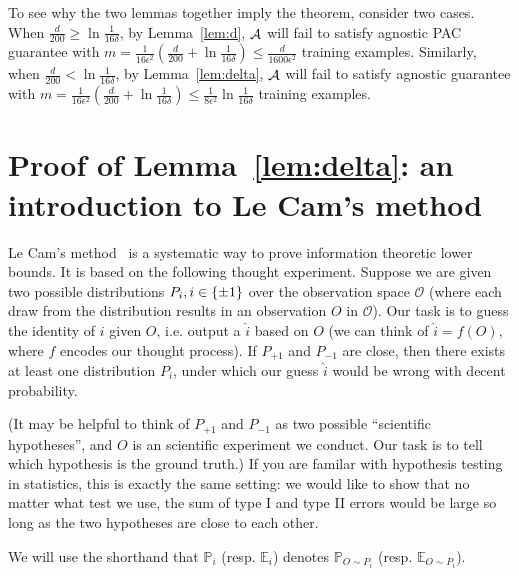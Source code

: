 \documentclass{article}
\DeclareMathOperator*{\Acal}{{\cal A}}
\newcommand{\EE}{\mathbb{E}}
\newcommand{\PP}{\mathbb{P}}
\newcommand{\Ocal}{\mathcal{O}}
\begin{document}
To see why the two lemmas together imply the theorem, consider two cases. When
$\frac{d}{200} \geq \ln\frac1{16\delta}$, by Lemma~\ref{lem:d}, $\Acal$ will fail to satisfy
agnostic PAC guarantee with
$m = \frac{1}{16\epsilon^2}(\frac{d}{200} + \ln\frac1{16\delta}) \leq \frac{d}{1600\epsilon^2}$ training examples. Similarly, when $\frac{d}{200} < \ln\frac1{16\delta}$, by Lemma~\ref{lem:delta}, $\Acal$ will fail to satisfy
agnostic guarantee with $m = \frac{1}{16\epsilon^2}(\frac{d}{200} + \ln\frac1{16\delta}) \leq \frac{1}{8\epsilon^2}\ln\frac1{16\delta}$ training examples.

\section{Proof of Lemma~\ref{lem:delta}: an introduction to Le Cam's method}
Le Cam's method~\cite{yu1997assouad} is a systematic way to prove information theoretic
lower bounds. It is based on the following thought experiment. Suppose we are given two possible distributions $P_i, i \in \cbr{\pm 1}$ over the observation space $\Ocal$ (where each draw from the distribution results in an observation $O$ in $\Ocal$).
Our task is to guess the identity of $i$ given $O$, i.e. output a $\hat{i}$ based on $O$ (we can think of $\hat{i} = f(O)$, where $f$ encodes our thought process). If $P_{+1}$ and $P_{-1}$ are close, then there exists at least one distribution $P_i$, under which our guess $\hat{i}$ would be wrong with decent probability.

(It may be helpful to think of $P_{+1}$ and $P_{-1}$ as two possible ``scientific hypotheses'', and $O$ is an scientific experiment we conduct. Our task is to tell which hypothesis is the ground truth.) If you are familar with hypothesis testing in statistics, this is exactly the same setting: we would like to show that no matter what test we use, the sum of type I and type II errors would be large so long as the two hypotheses are close to each other.


We will use the shorthand that $\PP_i$ (resp. $\EE_i$) denotes $\PP_{O \sim P_i}$ (resp. $\EE_{O \sim P_i}$).
\end{document}
